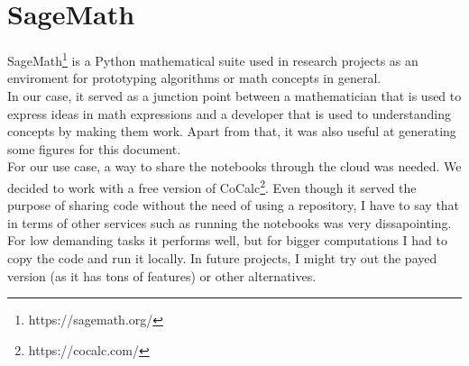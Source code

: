 \section{SageMath}

SageMath\footnote{https://sagemath.org/} is a Python mathematical suite used in
research projects as an enviroment for prototyping algorithms or math concepts in
general.\\

In our case, it served as a junction point between a mathematician that is used
to express ideas in math expressions and a developer that is used to
understanding concepts by making them work. Apart from that, it was also
useful at generating some figures for this document.\\

For our use case, a way to share the notebooks through the cloud was needed.
We decided to work with a free version of CoCalc\footnote{https://cocalc.com/}.
Even though it served the purpose of sharing code without the need of using a
repository, I have to say that in terms of other services such as running the
notebooks was very dissapointing. For low demanding tasks it performs well, but for
bigger computations I had to copy the code and run it locally. In future
projects, I might try out the payed version (as it has tons of features)
or other alternatives.\\
